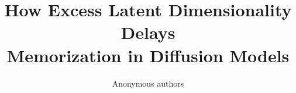 \documentclass{article}
\title{How Excess Latent Dimensionality Delays\\ Memorization in Diffusion Models}
\author{Anonymous authors}
\theoremstyle{plain}
\theoremstyle{definition}
\theoremstyle{remark}
\begin{document}
\maketitle

\raggedbottom

















\appendix
\onecolumn


\end{document}
